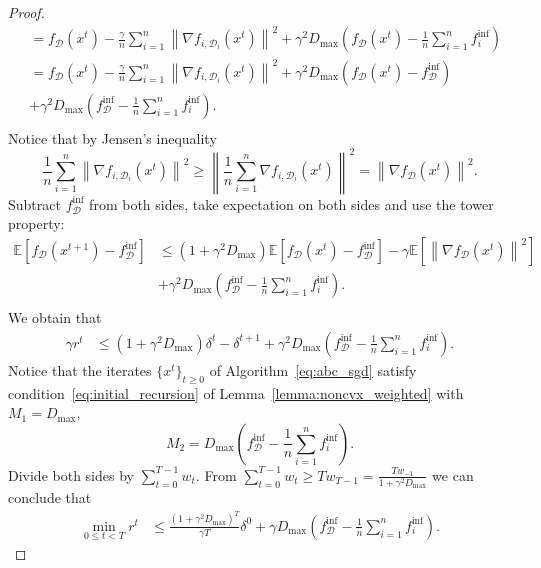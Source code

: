 \documentclass{article}
\newcommand{\bb}{\mathbb}
\newcommand{\cD}{\mathcal{D}}
\newcommand{\Exp}[1]{{\bb E}\left[#1\right]}
\theoremstyle{plain}
\newcommand{\tf}{f_{\mathcal{D}}}
\theoremstyle{plain}
\theoremstyle{definition}
\theoremstyle{remark}
\begin{document}
\begin{proof}
\begin{equation*}
\begin{split}
			& = \tf\left(x^t\right) - \frac{\gamma}{n}\sum_{i=1}^{n}\left\|\nabla f_{i, \cD_i}\left(x^t\right)\right\|^2
			+\gamma^2D_{\max}\left(\tf(x^t) - \frac{1}{n}\sum_{i=1}^{n}f_i^{\inf}\right)\\
			& = \tf\left(x^t\right) - \frac{\gamma}{n}\sum_{i=1}^{n}\left\|\nabla f_{i, \cD_i}\left(x^t\right)\right\|^2
			+\gamma^2D_{\max}\left(\tf(x^t) - \tf^{\inf}\right)\\
			& + \gamma^2D_{\max}\left(\tf^{\inf} - \frac{1}{n}\sum_{i=1}^{n}f^{\inf}_i\right).\\
		\end{split}
	\end{equation*}
	Notice that by Jensen's inequality
	\begin{equation*}
		\frac{1}{n}\sum_{i=1}^{n}\left\|\nabla f_{i, \cD_i}\left(x^t\right)\right\|^2\geq \left\|\frac{1}{n}\sum_{i=1}^{n}\nabla f_{i, \cD_i}\left(x^t\right)\right\|^2=\left\|\nabla \tf(x^t)\right\|^2.
	\end{equation*}
	Subtract $\tf^{\inf}$ from both sides, take expectation on both sides and use the tower property:
	\begin{equation*}
		\begin{split}
			\Exp{\tf\left(x^{t+1}\right) - \tf^{\inf}} & \leq \left(1 + \gamma^2D_{\max}\right)\Exp{\tf\left(x^{t}\right) - \tf^{\inf}} - \gamma \Exp{\left\|\nabla \tf\left(x^t\right)\right\|^2}\\
            &+ \gamma^2D_{\max}\left(\tf^{\inf} - \frac{1}{n}\sum_{i=1}^{n}f^{\inf}_i\right).\\
		\end{split}
	\end{equation*}
	We obtain that
	\begin{equation*}
		\begin{split}
			\gamma r^t & \leq \left(1 + \gamma^2D_{\max}\right)\delta^t- \delta^{t+1}
			+ \gamma^2D_{\max}\left(\tf^{\inf} - \frac{1}{n}\sum_{i=1}^{n}f^{\inf}_i\right).
		\end{split}
	\end{equation*}
	Notice that the iterates $\{x^t\}_{t\geq 0}$ of Algorithm~\ref{eq:abc_sgd} satisfy condition~\eqref{eq:initial_recursion} of Lemma~\ref{lemma:noncvx_weighted} with $M_1=D_{\max},$
	$$
	M_2=D_{\max}\left(\tf^{\inf} - \frac{1}{n}\sum_{i=1}^{n}f^{\inf}_i\right).
	$$
	Divide both sides by $\sum_{t=0}^{T-1}w_t.$ From $\sum_{t=0}^{T-1}w_t\geq Tw_{T-1} = \frac{Tw_{-1}}{1+\gamma^2D_{\max}}$ we can conclude that
	\begin{equation*}
		\begin{split}
			\min_{0 \leq t < T}r^t &\leq \frac{\left(1+\gamma^2 D_{\max}\right)^T}{\gamma T}\delta^0
			+ \gamma D_{\max}\left(\tf^{\inf} - \frac{1}{n}\sum_{i=1}^{n}f^{\inf}_i\right).
		\end{split}
	\end{equation*}
\end{proof}
\end{document}
